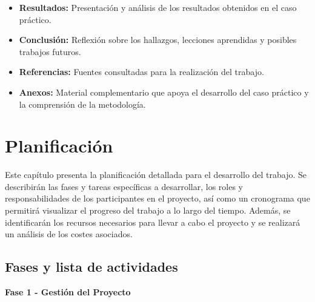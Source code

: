 \documentclass[a4paper, 10pt]{article}
\begin{document}
\begin{itemize}
    \item \textbf{Resultados:} Presentación y análisis de los resultados obtenidos en el caso práctico.
    
    \item \textbf{Conclusión:} Reflexión sobre los hallazgos, lecciones aprendidas y posibles trabajos futuros.
    
    \item \textbf{Referencias:} Fuentes consultadas para la realización del trabajo.
    
    \item \textbf{Anexos:}  Material complementario que apoya el desarrollo del caso práctico y la comprensión de la metodología.

\end{itemize}




\clearpage

\section{Planificación}
Este capítulo presenta la planificación detallada para el desarrollo del trabajo. Se describirán las fases y tareas específicas a desarrollar, los roles y responsabilidades de los participantes en el proyecto, así como un cronograma que permitirá visualizar el progreso del trabajo a lo largo del tiempo. Además, se identificarán los recursos necesarios para llevar a cabo el proyecto y se realizará un análisis de los costes asociados.

\subsection{Fases y lista de actividades}
\par\vspace{0.5cm}
\textbf{\large Fase 1 - Gestión del Proyecto} \vspace{0.5cm}
\end{document}
